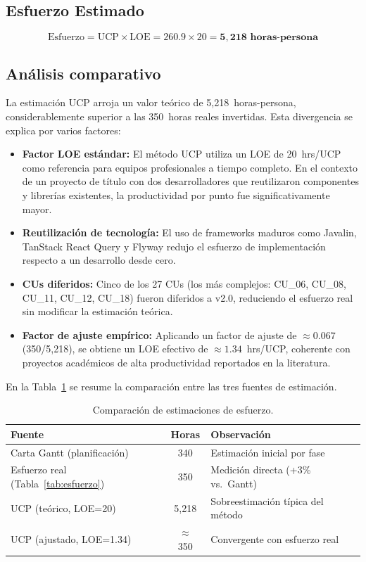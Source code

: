 \subsection{Esfuerzo Estimado}

\[
\text{Esfuerzo} = \text{UCP} \times \text{LOE} = 260.9 \times 20 = \mathbf{5{,}218 \text{ horas-persona}}
\]

\subsection{Análisis comparativo}

La estimación UCP arroja un valor teórico de 5{,}218~horas-persona, considerablemente superior a las 350~horas reales invertidas. Esta divergencia se explica por varios factores:

\begin{itemize}
    \item \textbf{Factor LOE estándar:} El método UCP utiliza un LOE de 20~hrs/UCP como referencia para equipos profesionales a tiempo completo. En el contexto de un proyecto de título con dos desarrolladores que reutilizaron componentes y librerías existentes, la productividad por punto fue significativamente mayor.

    \item \textbf{Reutilización de tecnología:} El uso de frameworks maduros como Javalin, TanStack React Query y Flyway redujo el esfuerzo de implementación respecto a un desarrollo desde cero.

    \item \textbf{CUs diferidos:} Cinco de los 27 CUs (los más complejos: CU\_06, CU\_08, CU\_11, CU\_12, CU\_18) fueron diferidos a v2.0, reduciendo el esfuerzo real sin modificar la estimación teórica.

    \item \textbf{Factor de ajuste empírico:} Aplicando un factor de ajuste de $\approx 0.067$ (350/5{,}218), se obtiene un LOE efectivo de $\approx 1.34$~hrs/UCP, coherente con proyectos académicos de alta productividad reportados en la literatura.
\end{itemize}

En la Tabla~\ref{tab:comparacion-estimaciones} se resume la comparación entre las tres fuentes de estimación.

\begin{table}[H]
\centering
\begin{tabular}{|p{}|c|p{}|}
\hline
\textbf{Fuente} & \textbf{Horas} & \textbf{Observación} \\
\hline
Carta Gantt (planificación) & 340 & Estimación inicial por fase \\
\hline
Esfuerzo real (Tabla~\ref{tab:esfuerzo}) & 350 & Medición directa (+3\% vs.\ Gantt) \\
\hline
UCP (teórico, LOE=20) & 5{,}218 & Sobreestimación típica del método \\
\hline
UCP (ajustado, LOE=1.34) & $\approx$ 350 & Convergente con esfuerzo real \\
\hline
\end{tabular}
\caption{Comparación de estimaciones de esfuerzo.}
\label{tab:comparacion-estimaciones}
\end{table}

